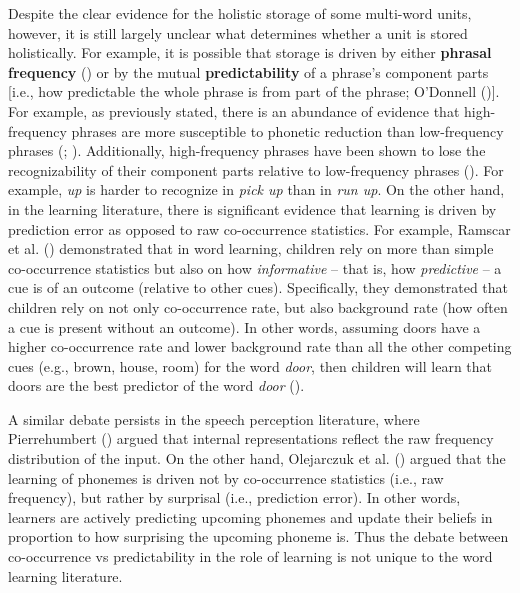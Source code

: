 \documentclass[
  12pt,
  letterpaper,
]{scrreprt}
\begin{document}
Despite the clear evidence for the holistic storage of some multi-word
units, however, it is still largely unclear what determines whether a
unit is stored holistically. For example, it is possible that storage is
driven by either \textbf{phrasal frequency}
() or by the mutual
\textbf{predictability} of a phrase's component parts {[}i.e., how
predictable the whole phrase is from part of the phrase; O'Donnell
(){]}. For
example, as previously stated, there is an abundance of evidence that
high-frequency phrases are more susceptible to phonetic reduction than
low-frequency phrases (;
).
Additionally, high-frequency phrases have been shown to lose the
recognizability of their component parts relative to low-frequency
phrases
(). For example, \emph{up} is harder to recognize in
\emph{pick up} than in \emph{run up}. On the other hand, in the learning
literature, there is significant evidence that learning is driven by
prediction error as opposed to raw co-occurrence statistics. For
example, Ramscar et al.
()
demonstrated that in word learning, children rely on more than simple
co-occurrence statistics but also on how \emph{informative} -- that is,
how \emph{predictive} -- a cue is of an outcome (relative to other
cues). Specifically, they demonstrated that children rely on not only
co-occurrence rate, but also background rate (how often a cue is present
without an outcome). In other words, assuming doors have a higher
co-occurrence rate and lower background rate than all the other
competing cues (e.g., brown, house, room) for the word \emph{door}, then
children will learn that doors are the best predictor of the word
\emph{door}
().

A similar debate persists in the speech perception literature, where
Pierrehumbert
() argued that
internal representations reflect the raw frequency distribution of the
input. On the other hand, Olejarczuk et al.
()
argued that the learning of phonemes is driven not by co-occurrence
statistics (i.e., raw frequency), but rather by surprisal (i.e.,
prediction error). In other words, learners are actively predicting
upcoming phonemes and update their beliefs in proportion to how
surprising the upcoming phoneme is. Thus the debate between
co-occurrence vs predictability in the role of learning is not unique to
the word learning literature.
\end{document}
